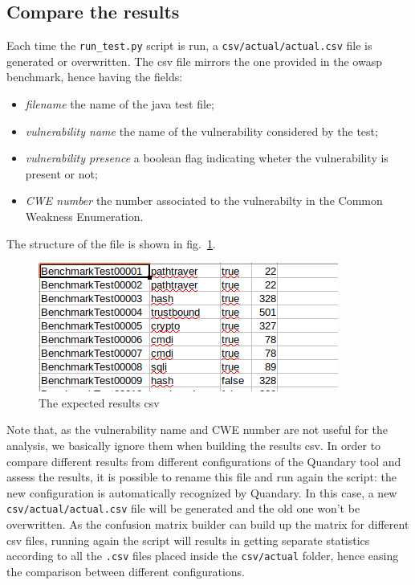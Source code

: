 \documentclass[../Report.tex]{subfiles}
\begin{document}
\subsection{Compare the results}
Each time the \texttt{run\_test.py} script is run, a \texttt{csv/actual/actual.csv} file is generated or overwritten. The csv file mirrors the one provided in the owasp benchmark, hence having the fields:
\begin{itemize}
	\item \emph{filename} the name of the java test file;
	\item \emph{vulnerability name} the name of the vulnerability considered by the test;
	\item \emph{vulnerability presence} a boolean flag indicating wheter the vulnerability is
	present or not;
	\item \emph{CWE number} the number associated to the vulnerabilty in the Common Weakness
	Enumeration.
\end{itemize}
The structure of the file is shown in fig.~\ref{img:csv}.

\begin{figure}
	\begin{center}
		\includegraphics[scale=0.5]{res.png}
	\end{center}
	\caption{The expected results csv}
	\label{img:csv}
\end{figure}

Note that, as the vulnerability name and CWE number are not useful for the analysis, we basically ignore them when building the results csv.
In order to compare different results from different configurations of the Quandary tool and assess the results, it is possible to rename this file and run again the script: the new configuration is automatically recognized by Quandary. In this case, a new \texttt{csv/actual/actual.csv} file will be generated and the old one won't be overwritten. As the confusion matrix builder can build up the matrix for different csv files, running again the script will results in getting separate statistics according to all the \texttt{.csv} files placed inside the \texttt{csv/actual} folder, hence easing the comparison between different configurations.
\end{document}
